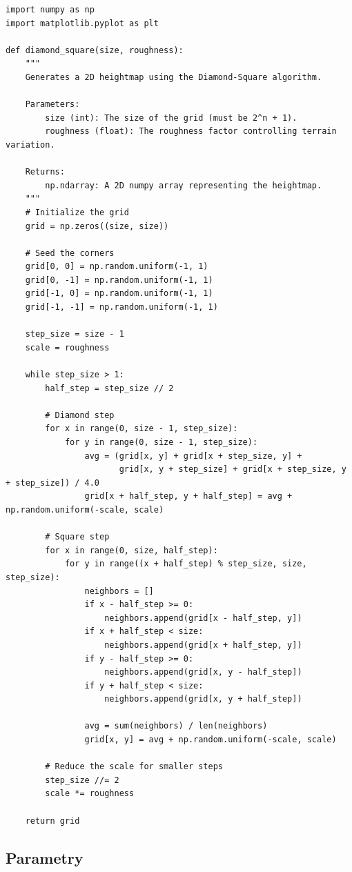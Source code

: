 \documentclass{article}
\begin{document}
\begin{verbatim}
import numpy as np
import matplotlib.pyplot as plt

def diamond_square(size, roughness):
    """
    Generates a 2D heightmap using the Diamond-Square algorithm.

    Parameters:
        size (int): The size of the grid (must be 2^n + 1).
        roughness (float): The roughness factor controlling terrain variation.

    Returns:
        np.ndarray: A 2D numpy array representing the heightmap.
    """
    # Initialize the grid
    grid = np.zeros((size, size))

    # Seed the corners
    grid[0, 0] = np.random.uniform(-1, 1)
    grid[0, -1] = np.random.uniform(-1, 1)
    grid[-1, 0] = np.random.uniform(-1, 1)
    grid[-1, -1] = np.random.uniform(-1, 1)

    step_size = size - 1
    scale = roughness

    while step_size > 1:
        half_step = step_size // 2

        # Diamond step
        for x in range(0, size - 1, step_size):
            for y in range(0, size - 1, step_size):
                avg = (grid[x, y] + grid[x + step_size, y] +
                       grid[x, y + step_size] + grid[x + step_size, y + step_size]) / 4.0
                grid[x + half_step, y + half_step] = avg + np.random.uniform(-scale, scale)

        # Square step
        for x in range(0, size, half_step):
            for y in range((x + half_step) % step_size, size, step_size):
                neighbors = []
                if x - half_step >= 0:
                    neighbors.append(grid[x - half_step, y])
                if x + half_step < size:
                    neighbors.append(grid[x + half_step, y])
                if y - half_step >= 0:
                    neighbors.append(grid[x, y - half_step])
                if y + half_step < size:
                    neighbors.append(grid[x, y + half_step])
                
                avg = sum(neighbors) / len(neighbors)
                grid[x, y] = avg + np.random.uniform(-scale, scale)

        # Reduce the scale for smaller steps
        step_size //= 2
        scale *= roughness

    return grid
\end{verbatim}

\subsection*{Parametry}
\end{document}
